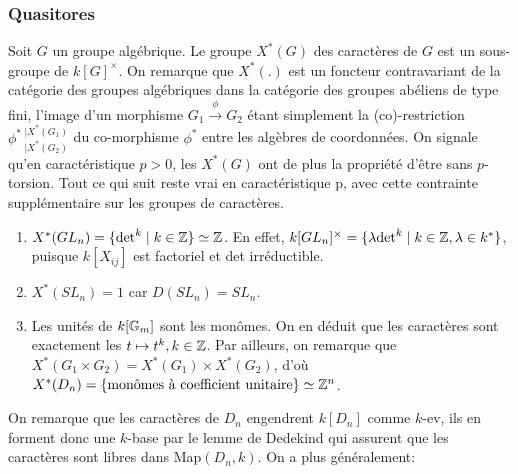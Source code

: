 \subsubsection{Quasitores}
Soit $G$ un groupe algébrique. Le groupe $X^*(G)$ des caractères de $G$ est un sous-groupe de $k[G]^\times$. On remarque que $X^*(.)$ est un foncteur contravariant de la catégorie des groupes algébriques dans la catégorie des groupes abéliens de type fini, l'image d'un morphisme $G_1\xrightarrow{\phi}G_2$ étant simplement la (co)-restriction $\phi^* \,_{|X^*(G_2)}^{|X^*(G_1)}$ du co-morphisme $\phi^*$ entre les algèbres de coordonnées. On signale qu'en caractéristique $p>0$, les $X^*(G)$ ont de plus la propriété d'être sans $p$-torsion. Tout ce qui suit reste vrai en caractéristique p, avec cette contrainte supplémentaire sur les groupes de caractères.

\begin{ex}
\begin{enumerate}
\item $X^*(GL_n)=\lbrace \textrm{det}^k\mid k\in \mathbb{Z} \rbrace\simeq\mathbb{Z}$. En effet, $k[GL_n]^\times =\lbrace \lambda\textrm{det}^k\mid k\in \mathbb{Z}, \lambda\in k^* \rbrace$, puisque $k[X_{ij}]$ est factoriel et det irréductible.
\item $X^*(SL_n)={1}$ car $D(SL_n)=SL_n$.
\item Les unités de $k[\mathbb{G}_m]$ sont les monômes. On en déduit que les caractères sont exactement les $t\mapsto t^k, k\in \mathbb{Z}$. Par ailleurs, on remarque que $X^*(G_1\times G_2)=X^*(G_1)\times X^*(G_2)$, d'où $X^*(D_n)=\lbrace \textrm{monômes à coefficient unitaire} \rbrace \simeq \mathbb{Z}^n$.
\end{enumerate}
\end{ex}

On remarque que les caractères de $D_n$ engendrent $k[D_n]$ comme $k$-ev, ils en forment donc une $k$-base par le lemme de Dedekind qui assurent que les caractères sont libres dans Map$(D_n, k)$. On a plus généralement:


